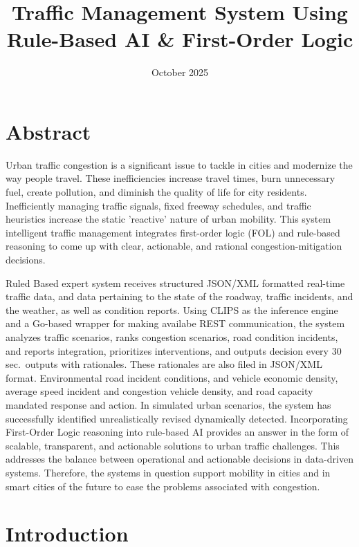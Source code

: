 \documentclass{article}
\title{Traffic Management System Using Rule-Based AI \& First-Order Logic}
\date{October 2025}
\begin{document}
\maketitle

\section*{Abstract}

Urban traffic congestion is a significant issue to tackle in cities and modernize the way people travel. These inefficiencies increase travel times, burn unnecessary fuel, create pollution, and diminish the quality of life for city residents. Inefficiently managing traffic signals, fixed freeway schedules, and traffic heuristics increase the static ’reactive’ nature of urban mobility. This system intelligent traffic management integrates first-order logic (FOL) and rule-based reasoning to come up with clear, actionable, and rational congestion-mitigation decisions.

Ruled Based expert system receives structured JSON/XML formatted real-time traffic data, and data pertaining to the state of the roadway, traffic incidents, and the weather, as well as condition reports. Using CLIPS as the inference engine and a Go-based wrapper for making availabe REST communication,  the system analyzes traffic scenarios, ranks congestion scenarios, road condition incidents, and reports integration, prioritizes interventions, and outputs decision every 30 sec.\ outputs with rationales. These rationales are also filed in JSON/XML format. Environmental road incident conditions, and vehicle economic density, average speed incident and congestion vehicle density, and road capacity mandated response and action. In simulated urban scenarios, the system has successfully identified unrealistically revised dynamically detected. Incorporating First-Order Logic reasoning into rule-based AI provides an answer in the form of scalable, transparent, and actionable solutions to urban traffic challenges. This addresses the balance between operational and actionable decisions in data-driven systems. Therefore, the systems in question support mobility in cities and in smart cities of the future to ease the problems associated with congestion.

\newpage
\tableofcontents
\newpage

\section{Introduction}
\end{document}
